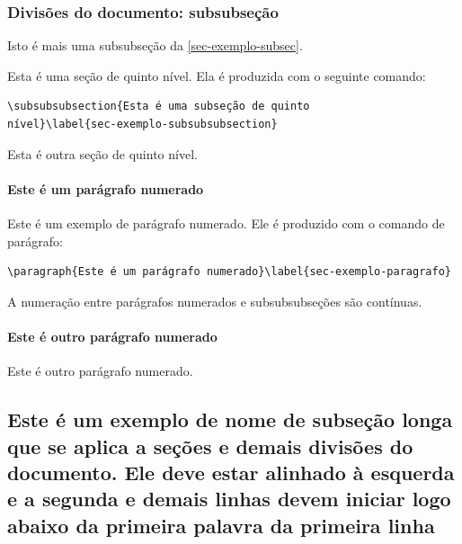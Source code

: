 \subsubsection{Divisões do documento: subsubseção}

Isto é mais uma subsubseção da \autoref{sec-exemplo-subsec}.


\label{sec-exemplo-subsubsubsection}

Esta é uma seção de quinto nível. Ela é produzida com o seguinte comando:

\begin{verbatim}
\subsubsubsection{Esta é uma subseção de quinto
nível}\label{sec-exemplo-subsubsubsection}
\end{verbatim}

\label{sec-exemplo-subsubsubsection-outro}

Esta é outra seção de quinto nível.


\paragraph{Este é um parágrafo numerado}\label{sec-exemplo-paragrafo}

Este é um exemplo de parágrafo numerado. Ele é produzido com o comando de
parágrafo:

\begin{verbatim}
\paragraph{Este é um parágrafo numerado}\label{sec-exemplo-paragrafo}
\end{verbatim}

A numeração entre parágrafos numerados e subsubsubseções são contínuas.

\paragraph{Este é outro parágrafo numerado}\label{sec-exemplo-paragrafo-outro}

Este é outro parágrafo numerado.

\subsection{Este é um exemplo de nome de subseção longa que se aplica a seções e demais divisões do documento. Ele deve estar alinhado à esquerda e a segunda e demais linhas devem iniciar logo abaixo da primeira palavra da primeira linha} 

